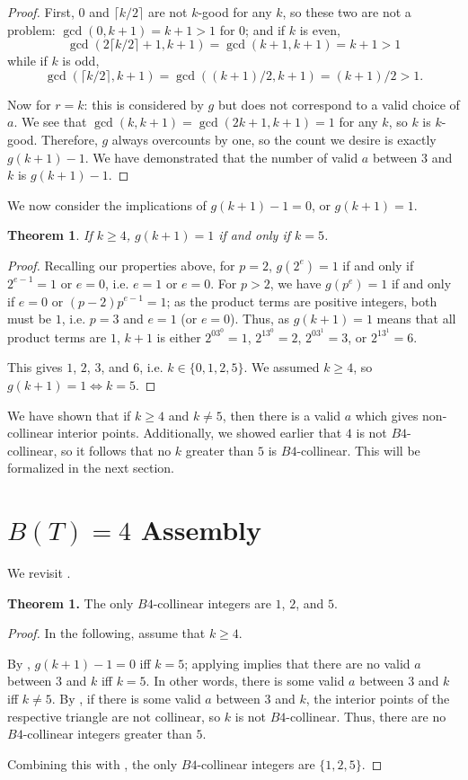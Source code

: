 \documentclass{article}
\theoremstyle{mydefstyle}
\newtheorem{theorem}{Theorem}
\begin{document}
\begin{proof}
First, $0$ and $\lceil k/2\rceil$ are not $k$-good for any $k$, so these two are not a problem: $\gcd(0,k+1)=k+1>1$ for $0$; and if $k$ is even, \[\gcd(2\lceil k/2\rceil+1,k+1)=\gcd(k+1,k+1)=k+1>1\] while if $k$ is odd, \[\gcd(\lceil k/2\rceil,k+1)=\gcd((k+1)/2,k+1)=(k+1)/2>1.\] 

Now for $r=k$: this is considered by $g$ but does not correspond to a valid choice of $a$. We see that $\gcd(k,k+1)=\gcd(2k+1,k+1)=1$ for any $k$, so $k$ is $k$-good. Therefore, $g$ always overcounts by one, so the count we desire is exactly $g(k+1)-1$. We have demonstrated that the number of valid $a$ between $3$ and $k$ is $g(k+1)-1$. 
\end{proof}

We now consider the implications of $g(k+1)-1=0$, or $g(k+1)=1$. 

\begin{theorem}
\label{latter:label}
If $k\ge4$, $g(k+1)=1$ if and only if $k=5$. 
\end{theorem}

\begin{proof}
Recalling our properties above, for $p=2$, $g(2^e)=1$ if and only if $2^{e-1}=1$ or $e=0$, i.e. $e=1$ or $e=0$. For $p>2$, we have $g(p^e)=1$ if and only if $e=0$ or $(p-2)p^{e-1}=1$; as the product terms are positive integers, both must be $1$, i.e. $p=3$ and $e=1$ (or $e=0$). Thus, as $g(k+1)=1$ means that all product terms are $1$, $k+1$ is either $2^03^0=1$, $2^13^0=2$, $2^03^1=3$, or $2^13^1=6$. 

This gives $1$, $2$, $3$, and $6$, i.e. $k\in\{0,1,2,5\}$. We assumed $k\ge4$, so $g(k+1)=1\iff k=5$. 
\end{proof}

We have shown that if $k\ge4$ and $k\neq5$, then there is a valid $a$ which gives non-collinear interior points. Additionally, we showed earlier that $4$ is not $B4$-collinear, so it follows that no $k$ greater than $5$ is $B4$-collinear. This will be formalized in the next section. 

\section{$B(T)=4$ Assembly}
We revisit . 

\textbf{Theorem 1.} The only $B4$-collinear integers are $1$, $2$, and $5$. 

\begin{proof}
In the following, assume that $k\ge4$. 

By , $g(k+1)-1=0$ iff $k=5$; applying  implies that there are no valid $a$ between $3$ and $k$ iff $k=5$. In other words, there is some valid $a$ between $3$ and $k$ iff $k\neq5$. By , if there is some valid $a$ between $3$ and $k$, the interior points of the respective triangle are not collinear, so $k$ is not $B4$-collinear. Thus, there are no $B4$-collinear integers greater than $5$. 

Combining this with , the only $B4$-collinear integers are $\{1,2,5\}$. 
\end{proof}
\end{document}
